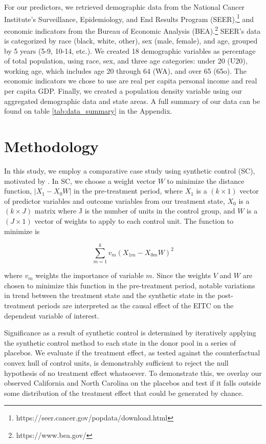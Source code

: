 \documentclass{article}
\begin{document}
For our predictors, we retrieved demographic data from the National Cancer Institute's Surveillance, Epidemiology, and End Results Program (SEER),\footnote{https://seer.cancer.gov/popdata/download.html} and economic indicators from the Bureau of Economic Analysis (BEA).\footnote{https://www.bea.gov/} SEER's data is categorized by race (black, white, other), sex (male, female), and age, grouped by 5 years (5-9, 10-14, etc.). We created 18 demographic variables as percentage of total population, using race, sex, and three age categories: under 20 (U20), working age, which includes age 20 through 64 (WA), and over 65 (65o). The economic indicators we chose to use are real per capita personal income and real per capita GDP. Finally, we created a population density variable using our aggregated demographic data and state areas. A full summary of our data can be found on table \ref{tab:data_summary} in the Appendix.

\section{Methodology}

In this study, we employ a comparative case study using synthetic control (SC), motivated by \cite{abadie2010synthetic}. In SC, we choose a weight vector $W$ to minimize the distance function, $\left \lvert X_{1} - X_{0}W \right \lvert $ in the pre-treatment period, where $X_{1}$ is a $(k \times 1)$ vector of predictor variables and outcome variables from our treatment state, $X_{0}$ is a $(k \times J)$ matrix where J is the number of units in the control group, and $W$ is a $(J \times 1)$ vector of weights to apply to each control unit. The function to minimize is 

\[ \sum_{m=1}^{k} v_{m}(X_{1m} - X_{0m} W)^{2} \]

where $v_{m}$ weights the importance of variable $m$. Since the weights $V$ and $W$ are chosen to minimize this function in the pre-treatment period, notable variations in trend between the treatment state and the synthetic state in the post-treatment periods are interpreted as the causal effect of the EITC on the dependent variable of interest. 

Significance as a result of synthetic control is determined by iteratively applying the synthetic control method to each state in the donor pool in a series of placebos. We evaluate if the treatment effect, as tested against the counterfactual convex hull of control units, is demonstrably sufficient to reject the null hypothesis of no treatment effect whatsoever. To demonstrate this, we overlay our observed California and North Carolina on the placebos and test if it falls outside some distribution of the treatment effect that could be generated by chance.  
\end{document}
